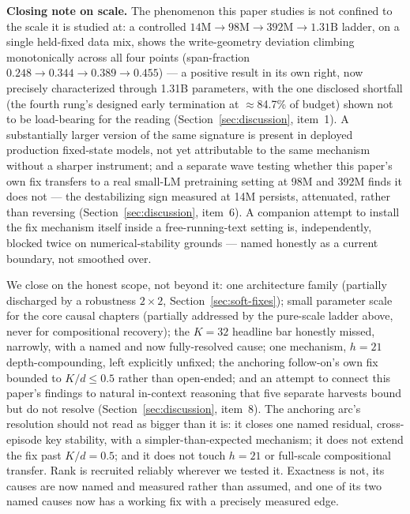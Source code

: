 \textbf{Closing note on scale.} The phenomenon this paper studies is not
confined to the scale it is studied at: a controlled
$14\mathrm{M}\to98\mathrm{M}\to392\mathrm{M}\to1.31\mathrm{B}$ ladder, on
a single held-fixed data mix, shows the write-geometry deviation climbing
monotonically across all four points (span-fraction
$0.248\to0.344\to0.389\to0.455$) --- a positive result in its own right,
now precisely characterized through 1.31B parameters, with the one
disclosed shortfall (the fourth rung's designed early termination at
$\approx$84.7\% of budget) shown not to be load-bearing for the reading
(Section~\ref{sec:discussion}, item~1). A substantially larger version of
the same signature is present in deployed production fixed-state models,
not yet attributable to the same mechanism without a sharper instrument;
and a separate wave testing whether this paper's own fix transfers to a
real small-LM pretraining setting at 98M and 392M finds it does not ---
the destabilizing sign measured at 14M persists, attenuated, rather than
reversing (Section~\ref{sec:discussion}, item~6). A companion attempt to
install the fix mechanism itself inside a free-running-text setting is,
independently, blocked twice on numerical-stability grounds --- named
honestly as a current boundary, not smoothed over.

We close on the honest scope, not beyond it: one architecture family
(partially discharged by a robustness $2\times2$, Section~\ref{sec:soft-fixes});
small parameter scale for the core causal chapters (partially addressed
by the pure-scale ladder above, never for compositional recovery); the
$K{=}32$ headline bar honestly missed, narrowly, with a named and now
fully-resolved cause; one mechanism, $h{=}21$ depth-compounding, left
explicitly unfixed; the anchoring follow-on's own fix bounded to
$K/d\leq0.5$ rather than open-ended; and an attempt to connect this
paper's findings to natural in-context reasoning that five separate
harvests bound but do not resolve (Section~\ref{sec:discussion}, item~8).
The anchoring arc's resolution should not read as bigger than it is: it
closes one named residual, cross-episode key stability, with a
simpler-than-expected mechanism; it does not extend the fix past
$K/d{=}0.5$; and it does not touch $h{=}21$ or full-scale compositional
transfer. Rank is recruited reliably wherever we tested it. Exactness is
not, its causes are now named and measured rather than assumed, and one
of its two named causes now has a working fix with a precisely measured
edge.
